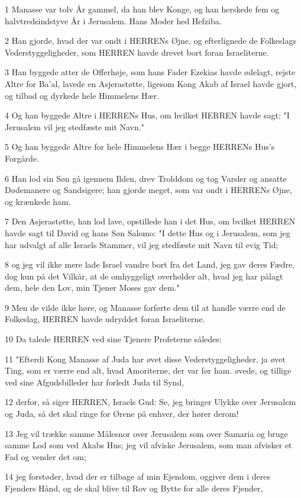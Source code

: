 \par 1 Manasse var tolv År gammel, da han blev Konge, og han herskede fem og halvtredsindstyve År i Jerusalem. Hans Moder hed Hefziba.
\par 2 Han gjorde, hvad der var ondt i HERRENs Øjne, og efterlignede de Folkeslags Vederstyggeligheder, som HERREN havde drevet bort foran Israeliterne.
\par 3 Han byggede atter de Offerhøje, som hans Fader Ezekias havde ødelagt, rejste Altre for Ba'al, lavede en Asjerastøtte, ligesom Kong Akab af Israel havde gjort, og tilbad og dyrkede hele Himmelens Hær.
\par 4 Og han byggede Altre i HERRENs Hus, om hvilket HERREN havde sagt: "I Jerusalem vil jeg stedfæste mit Navn."
\par 5 Og han byggede Altre for hele Himmelens Hær i begge HERRENs Hus's Forgårde.
\par 6 Han lod sin Søn gå igennem Ilden, drev Trolddom og tog Varsler og ansatte Dødemanere og Sandsigere; han gjorde meget, som var ondt i HERRENs Øjne, og krænkede ham.
\par 7 Den Asjerastøtte, han lod lave, opstillede han i det Hus, om bvilket HERREN havde sagt til David og hans Søn Salomo: "I dette Hus og i Jerusalem, som jeg har udvalgt af alle Israels Stammer, vil jeg stedfæste mit Navn til evig Tid;
\par 8 og jeg vil ikke mere lade Israel vandre bort fra det Land, jeg gav deres Fædre, dog kun på det Vilkår, at de omhyggeligt overholder alt, hvad jeg har pålagt dem, hele den Lov, min Tjener Moses gav dem."
\par 9 Men de vilde ikke høre, og Manasse forførte dem til at handle værre end de Folkeslag, HERREN havde udryddet foran Israeliterne.
\par 10 Da talede HERREN ved sine Tjenere Profeterne således:
\par 11 "Efterdi Kong Manasse af Juda har øvet disse Vederstyggeligheder, ja øvet Ting, som er værre end alt, hvad Amoriterne, der var før ham. øvede, og tillige ved sine Afgudsbilleder har forledt Juda til Synd,
\par 12 derfor, så siger HERREN, Israels Gud: Se, jeg bringer Ulykke over Jerusalem og Juda, så det skal ringe for Ørene på enhver, der hører derom!
\par 13 Jeg vil trække samme Målesnor over Jerusalem som over Samaria og bruge samme Lod som ved Akabs Hus; jeg vil afviske Jerusalem, som man afvisker et Fad og vender det om;
\par 14 jeg forstøder, hvad der er tilbage af min Ejendom, oggiver dem i deres Fjenders Hånd, og de skal blive til Rov og Bytte for alle deres Fjender,
